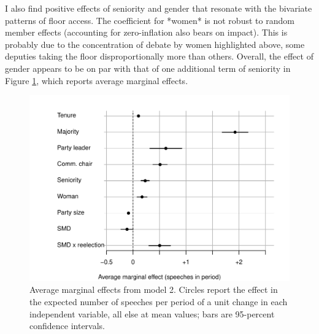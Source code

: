 \documentclass[letter,12pt]{article}
\begin{document}

I also find positive effects of seniority and gender that resonate with the bivariate patterns of floor access. The coefficient for *women* is not robust to random member effects (accounting for zero-inflation also bears on impact). This is probably due to the concentration of debate by women highlighted above, some deputies taking the floor disproportionally more than others. Overall, the effect of gender appears to be on par with that of one additional term of seniority in Figure \ref{F:avgmgeff}, which reports average marginal effects.

\begin{figure}
  \centering
    \includegraphics[width=.67\columnwidth]{../plots/avgMgEffects.pdf}
    \caption{Average marginal effects from model 2. Circles report the effect in the expected number of speeches per period of a unit change in each independent variable, all else at mean values; bars are 95-percent confidence intervals.}\label{F:avgmgeff}
\end{figure}
\end{document}
